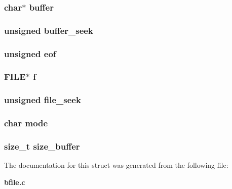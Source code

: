 \subsubsection[{buffer}]{\setlength{\rightskip}{0pt plus 5cm}char$\ast$ buffer}\label{structbfile_aff2566f4c366b48d73479bef43ee4d2e}
\subsubsection[{buffer\+\_\+seek}]{\setlength{\rightskip}{0pt plus 5cm}unsigned buffer\+\_\+seek}\label{structbfile_aca30292a051fc4985314320d3cbf9fa4}
\subsubsection[{eof}]{\setlength{\rightskip}{0pt plus 5cm}unsigned eof}\label{structbfile_aef4112a8c58f34b92863e0fe240d791f}
\subsubsection[{f}]{\setlength{\rightskip}{0pt plus 5cm}F\+I\+LE$\ast$ f}\label{structbfile_a3efb0e1a16208deecbd84c15401f7cf8}
\subsubsection[{file\+\_\+seek}]{\setlength{\rightskip}{0pt plus 5cm}unsigned file\+\_\+seek}\label{structbfile_a3b0be3218e5b929399c4d9e7679f09a8}
\subsubsection[{mode}]{\setlength{\rightskip}{0pt plus 5cm}char mode}\label{structbfile_a000e34997df38c2005a83d63e67d9282}
\subsubsection[{size\+\_\+buffer}]{\setlength{\rightskip}{0pt plus 5cm}size\+\_\+t size\+\_\+buffer}\label{structbfile_abef66a7af40c1b491eceb9cda4e788a2}


The documentation for this struct was generated from the following file\+:\begin{DoxyCompactItemize}
\item 
{\bf bfile.\+c}\end{DoxyCompactItemize}
